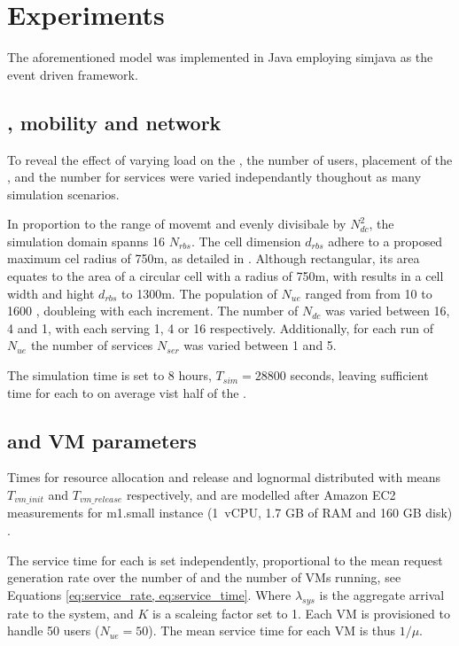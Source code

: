 \section{Experiments}
The aforementioned model was implemented in Java employing simjava \cite{SimJava} as the event driven framework.

\subsection{\Ue, mobility and network}
To reveal the effect of varying load on the \dcs, the number of users, placement of the \dcs{}, and the number for services were varied independantly thoughout as many simulation scenarios. 



In proportion to the range of movemt and evenly divisibale by $N_{dc}^2$, the simulation domain spanns 16 \rbss{} $N_{rbs}$. The cell dimension $d_{rbs}$ adhere to a proposed maximum cel radius of 750m, as detailed in \cite{shahab2013framework}. Although rectangular, its area equates to the area of a circular cell with a radius of 750m, with results in a cell width and hight $d_{rbs}$ to 1300m. The population of \ues{} $N_{ue}$ ranged from from 10 to 1600 \ues{}, doubleing with each increment. The number of \dcs{} $N_{dc}$ was varied between 16, 4 and 1, with each \dc{} serving 1, 4 or 16 \rbss{} respectively. Additionally, for each run of $N_{ue}$ the number of services $N_{ser}$ was varied between 1 and 5.

The simulation time is set to 8 hours, $T_{sim}=28800$ seconds, leaving sufficient time for each \ue to on average vist half of the \rbss.

\subsection{\Dc and VM parameters}
Times for resource allocation and release and lognormal distributed with means $T_{vm\_init}$ and $T_{vm\_release}$ respectively, and are modelled after Amazon EC2 measurements for m1.small instance (1~vCPU, 1.7 GB of RAM and 160 GB disk) \cite{5719609}. %

The service time for each \dc{} is set independently, proportional to the mean request generation rate over the number of \rbss{} and the number of VMs running, see Equations \ref{eq:service_rate, eq:service_time}. Where $\lambda_{sys}$ is the aggregate arrival rate to the system, and $K$ is a scaleing factor set to 1. Each VM is provisioned to handle 50 users ($N_{ue} = 50$). The mean service time for each VM is thus $1/\mu$.

